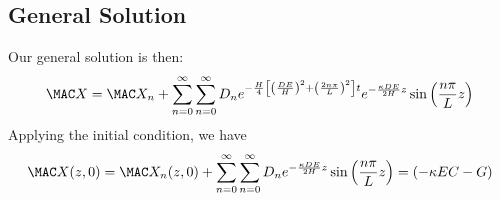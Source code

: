 \documentclass[11pt]{article}
\begin{document}
\subsection{General Solution}
Our general solution is then:
\begin{equation}\begin{aligned}
	\MAC X = \MAC X_n + \sum_{n=0}^{\infty} \sum_{n=0}^{\infty} D_n e^{-\frac{H}{4} \left[ \left(\frac{DE}{H}\right)^2 + \left( \frac{2n\pi}{L} \right)^2  \right] t} e^{-\frac{\kappa DE}{2H} z} \sin\left(\frac{n\pi}{L} z \right) \\
\end{aligned} \end{equation}
Applying the initial condition, we have
\begin{equation}\begin{aligned}
	\MAC X(z,0) = \MAC X_n(z,0) + \sum_{n=0}^{\infty} \sum_{n=0}^{\infty} D_n e^{-\frac{\kappa DE}{2H} z} \sin\left(\frac{n\pi}{L} z \right) = (- \kappa EC -G) \\
\end{aligned} \end{equation}
\end{document}
